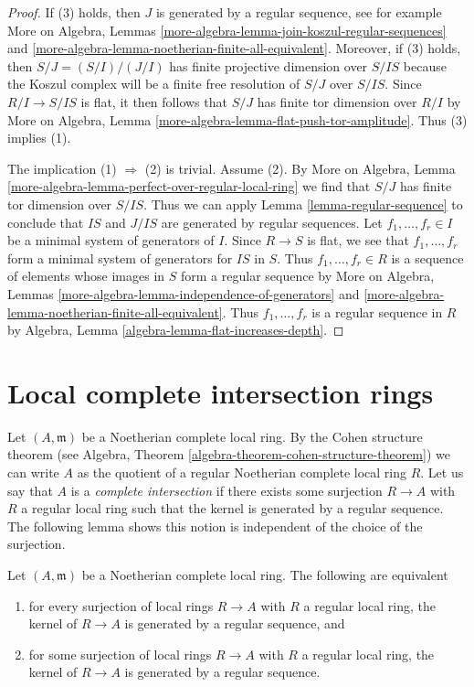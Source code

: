 \begin{proof}
If (3) holds, then $J$ is generated by a regular sequence, see for example
More on Algebra, Lemmas
\ref{more-algebra-lemma-join-koszul-regular-sequences} and
\ref{more-algebra-lemma-noetherian-finite-all-equivalent}.
Moreover, if (3) holds, then $S/J = (S/I)/(J/I)$
has finite projective dimension over $S/IS$ because the Koszul
complex will be a finite free resolution of $S/J$ over $S/IS$.
Since $R/I \to S/IS$ is flat, it then follows that $S/J$ has finite
tor dimension over $R/I$ by
More on Algebra, Lemma \ref{more-algebra-lemma-flat-push-tor-amplitude}.
Thus (3) implies (1).

\medskip\noindent
The implication (1) $\Rightarrow$ (2) is trivial.
Assume (2). By
More on Algebra, Lemma \ref{more-algebra-lemma-perfect-over-regular-local-ring}
we find that $S/J$ has finite tor dimension over $S/IS$.
Thus we can apply Lemma \ref{lemma-regular-sequence}
to conclude that $IS$ and $J/IS$ are generated by regular sequences.
Let $f_1, \ldots, f_r \in I$ be a minimal system of generators of $I$.
Since $R \to S$ is flat, we see that $f_1, \ldots, f_r$ form a minimal
system of generators for $IS$ in $S$. Thus $f_1, \ldots, f_r \in R$
is a sequence of elements whose images in $S$ form a regular sequence
by More on Algebra, Lemmas
\ref{more-algebra-lemma-independence-of-generators} and
\ref{more-algebra-lemma-noetherian-finite-all-equivalent}.
Thus $f_1, \ldots, f_r$ is a regular sequence in $R$ by
Algebra, Lemma \ref{algebra-lemma-flat-increases-depth}.
\end{proof}





\section{Local complete intersection rings}
\label{section-lci}

\noindent
Let $(A, \mathfrak m)$ be a Noetherian complete local ring.
By the Cohen structure theorem (see
Algebra, Theorem \ref{algebra-theorem-cohen-structure-theorem})
we can write $A$ as the quotient of a regular Noetherian
complete local ring $R$. Let us say that $A$ is a
{\it complete intersection}
if there exists some surjection $R \to A$
with $R$ a regular local ring such that the kernel
is generated by a regular sequence.
The following lemma shows this notion is independent of
the choice of the surjection.

\begin{lemma}
\label{lemma-ci-well-defined}
Let $(A, \mathfrak m)$ be a Noetherian complete local ring.
The following are equivalent
\begin{enumerate}
\item for every surjection of local rings $R \to A$ with $R$
a regular local ring, the kernel of $R \to A$ is generated
by a regular sequence, and
\item for some surjection of local rings $R \to A$ with $R$
a regular local ring, the kernel of $R \to A$ is generated
by a regular sequence.
\end{enumerate}
\end{lemma}

